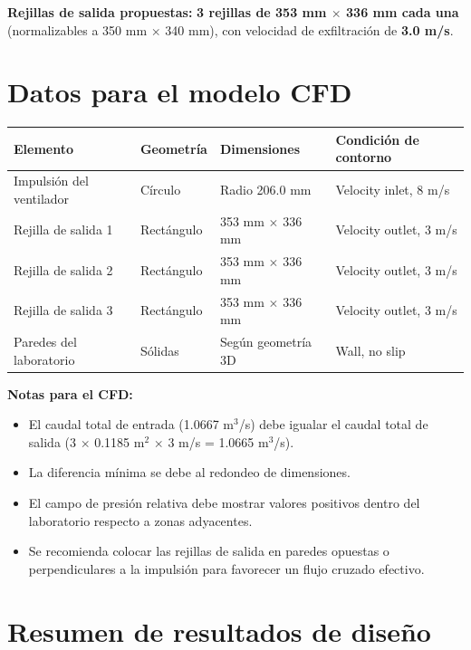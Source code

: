 \documentclass[12pt,a4paper]{article}
\begin{document}
\textbf{Rejillas de salida propuestas:} \textbf{3 rejillas de 353 mm $\times$ 336 mm cada una} (normalizables a 350 mm $\times$ 340 mm), con velocidad de exfiltración de \textbf{3.0 m/s}.

\section{Datos para el modelo CFD}

\begin{table}[h!]
\centering
{}
\begin{tabular}{@{}p{4cm}p{3cm}p{3.5cm}p{4cm}@{}}
\toprule
\textbf{Elemento} & \textbf{Geometría} & \textbf{Dimensiones} & \textbf{Condición de contorno} \\
\midrule
Impulsión del ventilador & Círculo & Radio 206.0 mm & Velocity inlet, 8 m/s \\
Rejilla de salida 1 & Rectángulo & 353 mm $\times$ 336 mm & Velocity outlet, 3 m/s \\
Rejilla de salida 2 & Rectángulo & 353 mm $\times$ 336 mm & Velocity outlet, 3 m/s \\
Rejilla de salida 3 & Rectángulo & 353 mm $\times$ 336 mm & Velocity outlet, 3 m/s \\
Paredes del laboratorio & Sólidas & Según geometría 3D & Wall, no slip \\
\bottomrule
\end{tabular}
\end{table}

\textbf{Notas para el CFD:}
\begin{itemize}[leftmargin=*]
    \item El caudal total de entrada (1.0667 m$^3$/s) debe igualar el caudal total de salida (3 $\times$ 0.1185 m$^2$ $\times$ 3 m/s = 1.0665 m$^3$/s).
    \item La diferencia mínima se debe al redondeo de dimensiones.
    \item El campo de presión relativa debe mostrar valores positivos dentro del laboratorio respecto a zonas adyacentes.
    \item Se recomienda colocar las rejillas de salida en paredes opuestas o perpendiculares a la impulsión para favorecer un flujo cruzado efectivo.
\end{itemize}

\section{Resumen de resultados de diseño}
\end{document}
